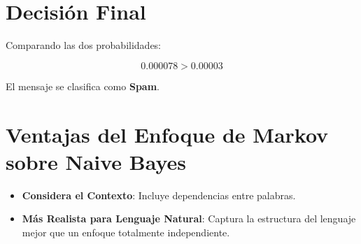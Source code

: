 \documentclass{article}
\begin{document}
\section{Decisión Final}
Comparando las dos probabilidades:

\begin{equation}
0.000078 > 0.00003
\end{equation}

El mensaje se clasifica como \textbf{Spam}.

\section{Ventajas del Enfoque de Markov sobre Naive Bayes}
\begin{itemize}
    \item \textbf{Considera el Contexto}: Incluye dependencias entre palabras.
    \item \textbf{Más Realista para Lenguaje Natural}: Captura la estructura del lenguaje mejor que un enfoque totalmente independiente.
\end{itemize}
\end{document}
